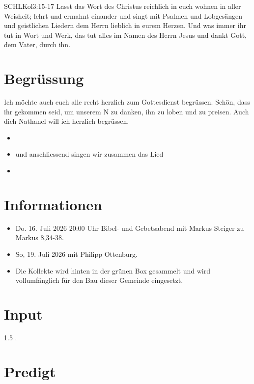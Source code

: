 \documentclass[fontsize=14pt]{mybib}
\author{OTS}
\newcommand{\Name}{Nathanel}
\begin{document}
\begin{bibelbox}{SCHL}{Kol}{3:15-17}
    Lasst das Wort des Christus reichlich in euch wohnen in aller Weisheit; lehrt und ermahnt einander und singt mit Psalmen und Lobgesängen und geistlichen Liedern dem Herrn lieblich in eurem Herzen. Und was immer ihr tut in Wort und Werk, das tut alles im Namen des Herrn Jesus und dankt Gott, dem Vater, durch ihn.
\end{bibelbox}
\section{Begrüssung}
Ich möchte auch euch alle recht herzlich zum Gottesdienst begrüssen. Schön, dass ihr gekommen seid, um unserem \herr N zu danken, ihn zu loben und zu preisen. 
Auch dich \Name{} will ich herzlich begrüssen. 

\begin{itemize}
    \item[] 
    \item[] und anschliessend singen wir zusammen das Lied
    \item[] 
\end{itemize}
\section{Informationen}
\begin{itemize}
    \item {} Do. 16. Juli 2026 20:00 Uhr Bibel- und Gebetsabend mit Markus Steiger zu Markus 8,34-38.\\
    \item {} So, 19. Juli 2026 mit Philipp Ottenburg.
    \item {} Die Kollekte wird hinten in der grünen Box gesammelt und wird vollumfänglich für den Bau dieser Gemeinde eingesetzt.
\end{itemize}
\section{Input}
\begin{spacing}{1.5}
    .
\end{spacing}
\section{Predigt}
\end{document}
